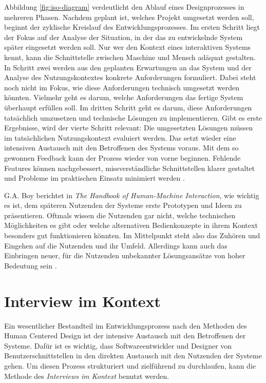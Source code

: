 Abbildung \ref{fig:iso-diagram} verdeutlicht den Ablauf eines Designprozesses in
mehreren Phasen. Nachdem geplant ist, welches Projekt umgesetzt werden soll,
beginnt der zyklische Kreislauf des Entwicklungsprozesses. Im ersten Schritt
liegt der Fokus auf der Analyse der Situation, in der das zu entwickelnde
System später eingesetzt werden soll. Nur wer den Kontext eines interaktiven
Systems kennt, kann die Schnittstelle zwischen Maschine und Mensch adäquat
gestalten. In Schritt zwei werden aus den geplanten Erwartungen an das System und der Analyse des Nutzungskontextes konkrete Anforderungen formuliert. Dabei steht noch nicht im Fokus, wie diese Anforderungen
technisch umgesetzt werden könnten. Vielmehr geht es darum, welche
Anforderungen das fertige System überhaupt erfüllen soll. Im dritten Schritt
geht es darum, diese Anforderungen tatsächlich umzusetzen und technische
Lösungen zu implementieren. Gibt es erste Ergebnisse, wird der vierte Schritt
relevant: Die umgesetzten Lösungen müssen im tatsächlichen Nutzungskontext
evaluiert werden. Das setzt wieder eine intensiven Austausch mit den
Betroffenen des Systems voraus. Mit dem so gewonnen Feedback kann der Prozess
wieder von vorne beginnen. Fehlende Features können nachgebessert,
missverständliche Schnittstellen klarer gestaltet und Probleme im praktischen
Einsatz minimiert werden \cite{ISO9241}.

G.A. Boy berichtet in \textit{The Handbook of Human-Machine Interaction}, wie
wichtig es ist, dem späteren Nutzenden der Systeme erste Prototypen und Ideen zu
präsentieren. Oftmals wissen die Nutzenden gar nicht, welche technischen
Möglichkeiten es gibt oder welche alternativen Bedienkonzepte in ihrem Kontext
besonders gut funktionieren könnten. Im Mittelpunkt steht also das Zuhören und Eingehen auf die
Nutzenden und ihr Umfeld. Allerdings kann auch das Einbringen neuer, für die Nutzenden
unbekannter Lösungsansätze von hoher Bedeutung sein \cite{HMI-HCD}.

\section{Interview im Kontext}

Ein wesentlicher Bestandteil im Entwicklungsprozess nach den Methoden des Human
Centered Design ist der intensive Austausch mit den Betroffenen der Systeme.
Dafür ist es wichtig, dass Softwareentwickler und Designer von
Benutzerschnittstellen in den direkten Austausch mit den Nutzenden der Systeme
gehen. Um diesen Prozess strukturiert und zielführend zu durchlaufen, kann
die Methode des \textit{Interviews im Kontext} benutzt werden.

